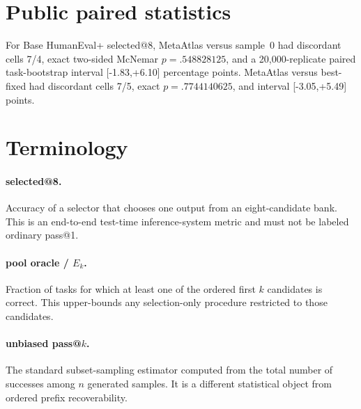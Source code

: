 \documentclass[11pt]{article}
\begin{document}
\section{Public paired statistics}

For Base HumanEval+ selected@8, MetaAtlas versus sample~0 had discordant cells 7/4, exact two-sided McNemar $p=.548828125$, and a 20,000-replicate paired task-bootstrap interval [-1.83,+6.10] percentage points. MetaAtlas versus best-fixed had discordant cells 7/5, exact $p=.7744140625$, and interval [-3.05,+5.49] points.

\section{Terminology}

\paragraph{selected@8.}
Accuracy of a selector that chooses one output from an eight-candidate bank. This is an end-to-end test-time inference-system metric and must not be labeled ordinary pass@1.

\paragraph{pool oracle / $E_k$.}
Fraction of tasks for which at least one of the ordered first $k$ candidates is correct. This upper-bounds any selection-only procedure restricted to those candidates.

\paragraph{unbiased pass@$k$.}
The standard subset-sampling estimator computed from the total number of successes among $n$ generated samples. It is a different statistical object from ordered prefix recoverability.
\end{document}
